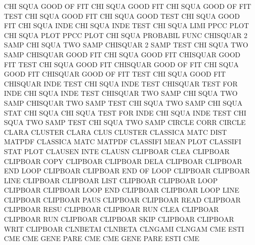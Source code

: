 CHI      SQUA GOOD OF   FIT             CHI      SQUA GOOD FIT
CHI      SQUA GOOD OF   FIT  TEST       CHI      SQUA GOOD FIT
CHI      SQUA GOOD TEST                 CHI      SQUA GOOD FIT
CHI      SQUA INDE                      CHI      SQUA INDE TEST
CHI      SQUA LIMI                      PPCC     PLOT
CHI      SQUA PLOT                      PPCC     PLOT
CHI      SQUA                           PROBABIL FUNC
CHISQUAR 2    SAMP                      CHI      SQUA TWO  SAMP
CHISQUAR 2    SAMP TEST                 CHI      SQUA TWO  SAMP
CHISQUAR GOOD FIT                       CHI      SQUA GOOD FIT
CHISQUAR GOOD FIT  TEST                 CHI      SQUA GOOD FIT
CHISQUAR GOOD OF   FIT                  CHI      SQUA GOOD FIT
CHISQUAR GOOD OF   FIT  TEST            CHI      SQUA GOOD FIT
CHISQUAR INDE TEST                      CHI      SQUA INDE TEST
CHISQUAR TEST FOR  INDE                 CHI      SQUA INDE TEST
CHISQUAR TWO  SAMP                      CHI      SQUA TWO  SAMP
CHISQUAR TWO  SAMP TEST                 CHI      SQUA TWO  SAMP
CHI      SQUA STAT                      CHI      SQUA
CHI      SQUA TEST FOR  INDE            CHI      SQUA INDE TEST
CHI      SQUA TWO  SAMP TEST            CHI      SQUA TWO  SAMP
CIRCLE   CORR                           CIRCLE
CLARA                                   CLUSTER
CLARA    CLUS                           CLUSTER
CLASSICA MATC DIST                      MATPDF
CLASSICA MATC                           MATPDF
CLASSIFI MEAN PLOT                      CLASSIFI STAT PLOT
CLAUSEN  INTE                           CLAUSN
CLIPBOAR CLEA                           CLIPBOAR
CLIPBOAR COPY                           CLIPBOAR
CLIPBOAR DELA                           CLIPBOAR
CLIPBOAR END  LOOP                      CLIPBOAR
CLIPBOAR END  OF   LOOP                 CLIPBOAR
CLIPBOAR LINE                           CLIPBOAR
CLIPBOAR LIST                           CLIPBOAR
CLIPBOAR LOOP                           CLIPBOAR
CLIPBOAR LOOP END                       CLIPBOAR
CLIPBOAR LOOP LINE                      CLIPBOAR
CLIPBOAR PAUS                           CLIPBOAR
CLIPBOAR READ                           CLIPBOAR
CLIPBOAR RESU                           CLIPBOAR
CLIPBOAR RUN  CLEA                      CLIPBOAR
CLIPBOAR RUN                            CLIPBOAR
CLIPBOAR SKIP                           CLIPBOAR
CLIPBOAR WRIT                           CLIPBOAR
CLNBETAI                                CLNBETA
CLNGAMI                                 CLNGAM
CME      ESTI                           CME
CME      GENE PARE                      CME
CME      GENE PARE ESTI                 CME
